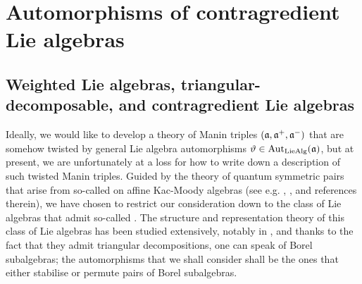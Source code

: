\section{Automorphisms of contragredient Lie algebras}
    \subsection{Weighted Lie algebras, triangular-decomposable, and contragredient Lie algebras}
        Ideally, we would like to develop a theory of Manin triples $(\mathfrak{a}, \mathfrak{a}^+, \mathfrak{a}^-)$ that are somehow twisted by general Lie algebra automorphisms $\vartheta \in \operatorname{Aut}_{\mathrm{Lie}\mathrm{Alg}}(\mathfrak{a})$, but at present, we are unfortunately at a loss for how to write down a description of such twisted Manin triples. Guided by the theory of quantum symmetric pairs that arise from so-called  on affine Kac-Moody algebras (see e.g. \cite{regelskis_vlaar_reflection_matrices_coideal_subalgebras}, \cite{kolb_kac_moody_QSPs}, and references therein), we have chosen to restrict our consideration down to the class of Lie algebras that admit so-called . The structure and representation theory of this class of Lie algebras has been studied extensively, notably in \cite{moody_pianzola_lie_algebras_with_triangular_decompositions}, and thanks to the fact that they admit triangular decompositions, one can speak of Borel subalgebras; the automorphisms that we shall consider shall be the ones that either stabilise or permute pairs of Borel subalgebras.
        
